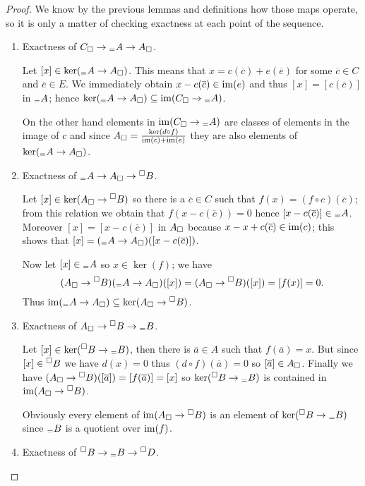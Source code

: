 \begin{proof}
  We know by the previous lemmas and definitions how those maps operate, so it is only a matter of checking exactness at each point of the sequence.
  \begin{enumerate}
  \item Exactness of \({C}_{\Box}\to{}_={A}\to{A}_{\Box}\).
    
    Let \([x]\in\ker({}_={A}\to{A}_{\Box})\). This means that \(x = c(\overline{c}) + e(\overline{e})\) for some \(\overline{c}\in C\) and \(\overline{e}\in E\). We immediately obtain \(x - c(\overline{c})\in\operatorname{im}(e) \) and thus \([x] = [c(\overline{c})]\) in \({}_={A}\); hence \(\ker({}_={A}\to{A}_{\Box})\subseteq\operatorname{im}({C}_{\Box}\to{}_={A})\).

    On the other hand elements in \(\operatorname{im}({C}_{\Box}\to{}_={A})\) are classes of elements in the image of \(c\) and since \({A}_{\Box} = \frac{\ker(d\circ f)}{\operatorname{im}(c) + \operatorname{im}(e)}\) they are also elements of \(\ker({}_={A}\to{A}_{\Box})\).
  \item Exactness of \({}_={A}\to{A}_{\Box}\to{}^{\Box}{B}\).

    Let \([x]\in\ker({A}_{\Box}\to{}^{\Box}{B})\) so there is a \(\overline{c}\in C\) such that \(f(x) = (f\circ c)(\overline{c})\); from this relation we obtain that \(f(x - c(\overline{c})) = 0\) hence \([x - c(\overline{c})]\in{}_={A}\). Moreover \([x] = [x - c(\overline{c})]\) in \({A}_{\Box}\) because \(x - x + c(\overline{c}) \in\operatorname{im}(c)\); this shows that \([x] = ({}_={A}\to{A}_{\Box})([x - c(\overline{c})])\).

    Now let \([x]\in{}_={A}\) so \(x\in\ker(f)\); we have
    \begin{equation*}
      ({A}_{\Box}\to{}^{\Box}{B})({}_={A}\to{A}_{\Box})([x]) = ({A}_{\Box}\to{}^{\Box}{B})([x]) = [f(x)] = 0.
    \end{equation*}
    Thus \(\operatorname{im}({}_={A}\to{A}_{\Box})\subseteq\ker({A}_{\Box}\to{}^{\Box}{B})\).
  \item  Exactness of \({A}_{\Box}\to{}^{\Box}{B}\to{}_={B}\).

    Let \([x]\in\ker({}^{\Box}{B}\to{}_={B})\), then there is \(\overline{a}\in A\) such that \(f(\overline{a}) = x\). But since \([x]\in{}^{\Box}{B}\) we have \(d(x) = 0\) thus \((d\circ f)(\overline{a}) = 0\) so \([\overline{a}]\in{A}_{\Box}\). Finally we have \(({A}_{\Box}\to{}^{\Box}{B})([\overline{a}]) = [f(\overline{a})] = [x]\) so \(\ker({}^{\Box}{B}\to{}_={B})\) is contained in \(\operatorname{im}({A}_{\Box}\to{}^{\Box}{B})\).

    Obviously every element of \(\operatorname{im}({A}_{\Box}\to{}^{\Box}{B})\) is an element of \(\ker({}^{\Box}{B}\to{}_={B})\) since \({}_={B}\) is a quotient over \(\operatorname{im}(f)\).
  \item Exactness of \({}^{\Box}{B}\to{}_={B}\to{}^{\Box}{D}\).


\end{enumerate}
\end{proof}
